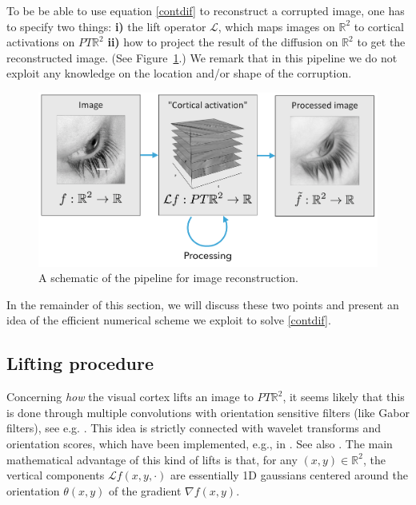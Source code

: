 \documentclass[proc]{edpsmath}
\begin{document}
To be be able to use equation \eqref{contdif} to reconstruct a corrupted image, one has to specify two things: {\bf i)} the lift operator $\mathcal L$, which maps images on $\mathbb R^2$ to cortical activations on $PT\mathbb R^2$
 {\bf ii)}  how to project the result of the diffusion on $\mathbb{R}^2$ to get the reconstructed image.
(See Figure~\ref{fig:pipeline}.) We remark that in this pipeline we do not exploit any knowledge on the location and/or shape of the corruption.
 \begin{figure}
   \includegraphics[width=.7\textwidth]{imgs/pipeline}
   \caption{A schematic of the pipeline for image reconstruction.}
   \label{fig:pipeline}
 \end{figure}

In the remainder of this section, we will discuss these two points and present an idea of the efficient numerical scheme we exploit to solve \eqref{contdif}.




\subsection{Lifting procedure}

Concerning \emph{how} the visual cortex lifts an image to $PT\mathbb R^2$, it seems likely that this is done through multiple convolutions with orientation sensitive filters (like Gabor filters), see e.g. \cite{Daugman1985}. This idea is strictly connected with wavelet transforms and orientation scores, which have been implemented, e.g., in \cite{Duits2008,Duits2010a}. See also \cite{gros-papier}. The main mathematical advantage of this kind of lifts is that, for any $(x,y)\in\mathbb R^2$, the vertical components $\mathcal Lf (x,y,\cdot)$ are essentially 1D gaussians centered around the orientation $\theta(x,y)$ of the gradient $\nabla f(x,y)$.
\end{document}
